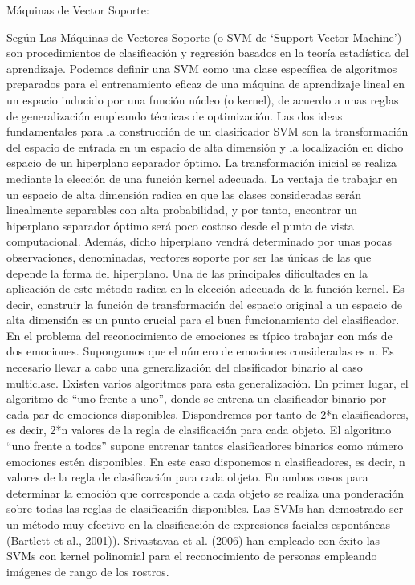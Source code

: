 \begin{enumerate}
{\bf \item Máquinas de Vector Soporte:} \vskip 0.1cm
Según \citep{Isaac} Las Máquinas de Vectores Soporte (o SVM de ‘Support Vector Machine’) son procedimientos de clasificación y regresión basados en la teoría estadística del aprendizaje. Podemos definir una SVM como una clase específica de algoritmos preparados para el entrenamiento eficaz de una máquina de aprendizaje lineal en un espacio inducido por una función núcleo (o kernel), de acuerdo a unas reglas de generalización empleando técnicas de optimización. Las dos ideas fundamentales para la construcción de un clasificador SVM son la transformación del espacio de entrada en un espacio de alta dimensión y la localización en dicho espacio de un hiperplano separador óptimo. La transformación inicial se realiza mediante la elección de una función kernel adecuada. La ventaja de trabajar en un espacio de alta dimensión radica en que las clases consideradas serán linealmente separables con alta probabilidad, y por tanto, encontrar un hiperplano separador óptimo será poco costoso desde el punto de vista computacional. Además, dicho hiperplano vendrá determinado por unas pocas observaciones, denominadas, vectores soporte por ser las únicas de las que depende la forma del hiperplano. Una de las principales dificultades en la aplicación de este método radica en la elección adecuada de la función kernel. Es decir, construir la función de transformación del espacio original a un espacio de alta dimensión es un punto crucial para el buen funcionamiento del clasificador.
\vskip 0.1cm
En el problema del reconocimiento de emociones es típico trabajar con más de dos emociones. Supongamos que el número de emociones consideradas es n. Es necesario llevar a cabo una generalización del clasificador binario al caso multiclase.
\vskip 0.1cm
Existen varios algoritmos para esta generalización. En primer lugar, el algoritmo de “uno frente a uno”, donde se entrena un clasificador binario por cada par de emociones disponibles. Dispondremos por tanto de 2*n clasificadores, es decir, 2*n valores de la regla de clasificación para cada objeto. El algoritmo “uno frente a todos” supone entrenar tantos clasificadores binarios como número emociones estén disponibles. En este caso disponemos n clasificadores, es decir, n valores de la regla de clasificación para cada objeto. En ambos casos para determinar la emoción que corresponde a cada objeto se realiza una ponderación sobre todas las reglas de clasificación disponibles.
\vskip 0.1cm
Las SVMs han demostrado ser un método muy efectivo en la clasificación de expresiones faciales espontáneas (Bartlett et al., 2001)). Srivastavaa et al. (2006) han empleado con éxito las SVMs con kernel polinomial para el reconocimiento de personas empleando imágenes de rango de los rostros.


\end{enumerate}
